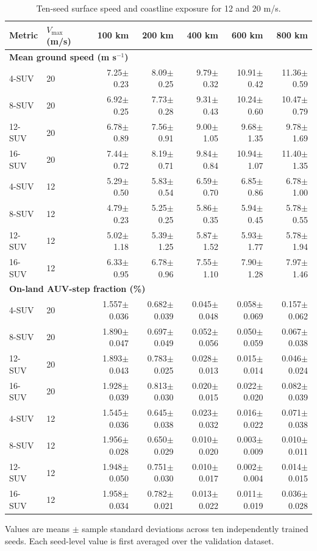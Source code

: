 \begin{table}[p]
\centering
\caption{Ten-seed surface speed and coastline exposure for 12 and 20 m/s.}
\label{tab:surface_vmax_operational}
\scriptsize
\setlength{\tabcolsep}{3pt}
\begin{tabular}{@{}llrrrrr@{}}
\toprule
Metric & $V_{\max}$ (m/s) & 100 km & 200 km & 400 km & 600 km & 800 km \\
\midrule
\multicolumn{7}{l}{\textbf{Mean ground speed (m s$^{-1}$)}} \\
4-SUV & 20 & 7.25$\pm$0.23 & 8.09$\pm$0.25 & 9.79$\pm$0.32 & 10.91$\pm$0.42 & 11.36$\pm$0.59 \\
8-SUV & 20 & 6.92$\pm$0.25 & 7.73$\pm$0.28 & 9.31$\pm$0.43 & 10.24$\pm$0.60 & 10.47$\pm$0.79 \\
12-SUV & 20 & 6.78$\pm$0.89 & 7.56$\pm$0.91 & 9.00$\pm$1.05 & 9.68$\pm$1.35 & 9.78$\pm$1.69 \\
16-SUV & 20 & 7.44$\pm$0.72 & 8.19$\pm$0.71 & 9.84$\pm$0.84 & 10.94$\pm$1.07 & 11.40$\pm$1.35 \\
4-SUV & 12 & 5.29$\pm$0.50 & 5.83$\pm$0.54 & 6.59$\pm$0.70 & 6.85$\pm$0.86 & 6.78$\pm$1.00 \\
8-SUV & 12 & 4.79$\pm$0.23 & 5.25$\pm$0.25 & 5.86$\pm$0.35 & 5.94$\pm$0.45 & 5.78$\pm$0.55 \\
12-SUV & 12 & 5.02$\pm$1.18 & 5.39$\pm$1.25 & 5.87$\pm$1.52 & 5.93$\pm$1.77 & 5.78$\pm$1.94 \\
16-SUV & 12 & 6.33$\pm$0.95 & 6.78$\pm$0.96 & 7.55$\pm$1.10 & 7.90$\pm$1.28 & 7.97$\pm$1.46 \\
\midrule
\multicolumn{7}{l}{\textbf{On-land AUV-step fraction (\%)}} \\
4-SUV & 20 & 1.557$\pm$0.036 & 0.682$\pm$0.039 & 0.045$\pm$0.048 & 0.058$\pm$0.069 & 0.157$\pm$0.062 \\
8-SUV & 20 & 1.890$\pm$0.047 & 0.697$\pm$0.049 & 0.052$\pm$0.056 & 0.050$\pm$0.059 & 0.067$\pm$0.038 \\
12-SUV & 20 & 1.893$\pm$0.043 & 0.783$\pm$0.025 & 0.028$\pm$0.013 & 0.015$\pm$0.014 & 0.046$\pm$0.024 \\
16-SUV & 20 & 1.928$\pm$0.039 & 0.813$\pm$0.030 & 0.020$\pm$0.015 & 0.022$\pm$0.020 & 0.082$\pm$0.039 \\
4-SUV & 12 & 1.545$\pm$0.036 & 0.645$\pm$0.038 & 0.023$\pm$0.032 & 0.016$\pm$0.022 & 0.071$\pm$0.038 \\
8-SUV & 12 & 1.956$\pm$0.028 & 0.650$\pm$0.029 & 0.010$\pm$0.020 & 0.003$\pm$0.009 & 0.010$\pm$0.011 \\
12-SUV & 12 & 1.948$\pm$0.050 & 0.751$\pm$0.030 & 0.010$\pm$0.017 & 0.002$\pm$0.004 & 0.014$\pm$0.015 \\
16-SUV & 12 & 1.958$\pm$0.034 & 0.782$\pm$0.021 & 0.013$\pm$0.022 & 0.011$\pm$0.019 & 0.036$\pm$0.028 \\
\bottomrule
\end{tabular}
\par\smallskip
\parbox{\textwidth}{\footnotesize Values are means $\pm$ sample standard deviations across ten independently trained seeds. Each seed-level value is first averaged over the validation dataset.}
\end{table}
